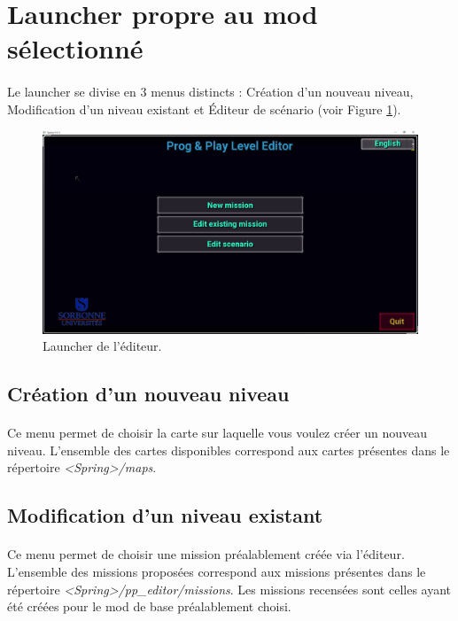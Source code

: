 \documentclass[a4paper]{article}
\begin{document}
\section{Launcher propre au mod sélectionné}\label{launcher}
\paragraph{ }
Le launcher se divise en 3 menus distincts : Création d'un nouveau niveau, Modification d'un niveau existant et Éditeur de scénario (voir Figure \ref{fig:launcher-main}).
\begin{figure}[H]
\centering
\includegraphics[width=\linewidth]{launcher-main.png}
\caption{Launcher de l'éditeur.}
\label{fig:launcher-main}
\end{figure}
\subsection{Création d'un nouveau niveau}
\paragraph{ }
Ce menu permet de choisir la carte sur laquelle vous voulez créer un nouveau niveau. L'ensemble des cartes disponibles correspond aux cartes présentes dans le répertoire \textit{<Spring>/maps}.
\subsection{Modification d'un niveau existant}
\paragraph{ }
Ce menu permet de choisir une mission préalablement créée via l'éditeur. L'ensemble des missions proposées correspond aux missions présentes dans le répertoire \textit{<Spring>/pp\_editor/missions}. Les missions recensées sont celles ayant été créées pour le mod de base préalablement choisi.
\end{document}
